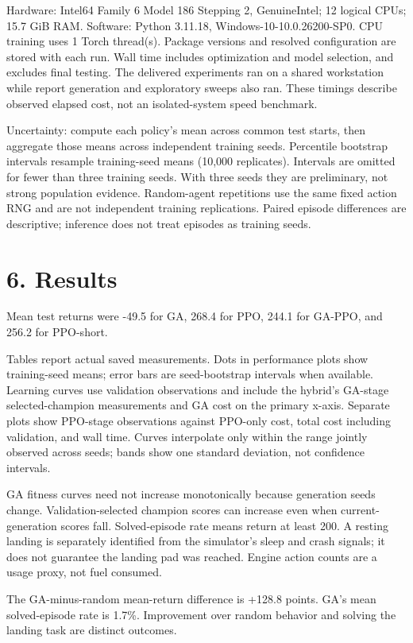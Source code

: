 \documentclass[11pt,a4paper]{article}
\begin{document}
Hardware: Intel64 Family 6 Model 186 Stepping 2, GenuineIntel; 12 logical CPUs; 15.7 GiB RAM. Software: Python 3.11.18, Windows-10-10.0.26200-SP0. CPU training uses 1 Torch thread(s). Package versions and resolved configuration are stored with each run. Wall time includes optimization and model selection, and excludes final testing. The delivered experiments ran on a shared workstation while report generation and exploratory sweeps also ran. These timings describe observed elapsed cost, not an isolated-system speed benchmark.

Uncertainty: compute each policy's mean across common test starts, then aggregate those means across independent training seeds. Percentile bootstrap intervals resample training-seed means (10,000 replicates). Intervals are omitted for fewer than three training seeds. With three seeds they are preliminary, not strong population evidence. Random-agent repetitions use the same fixed action RNG and are not independent training replications. Paired episode differences are descriptive; inference does not treat episodes as training seeds.

\section*{6. Results}
Mean test returns were -49.5 for GA, 268.4 for PPO, 244.1 for GA-PPO, and 256.2 for PPO-short.

Tables report actual saved measurements. Dots in performance plots show training-seed means; error bars are seed-bootstrap intervals when available. Learning curves use validation observations and include the hybrid's GA-stage selected-champion measurements and GA cost on the primary x-axis. Separate plots show PPO-stage observations against PPO-only cost, total cost including validation, and wall time. Curves interpolate only within the range jointly observed across seeds; bands show one standard deviation, not confidence intervals.

GA fitness curves need not increase monotonically because generation seeds change. Validation-selected champion scores can increase even when current-generation scores fall. Solved-episode rate means return at least 200. A resting landing is separately identified from the simulator's sleep and crash signals; it does not guarantee the landing pad was reached. Engine action counts are a usage proxy, not fuel consumed.

The GA-minus-random mean-return difference is +128.8 points. GA's mean solved-episode rate is 1.7\%. Improvement over random behavior and solving the landing task are distinct outcomes.
\end{document}
